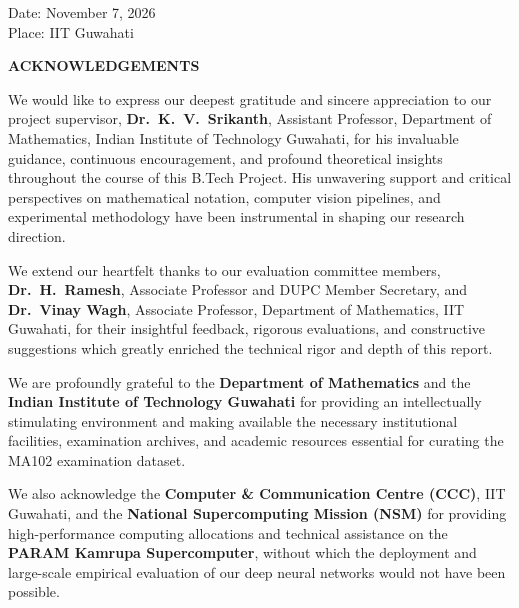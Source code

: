 \documentclass[12pt,a4paper]{report}
\theoremstyle{plain}
\theoremstyle{definition}
\theoremstyle{remark}
\begin{document}
\vspace{1.2cm}
\noindent Date: November 7, 2026 \\
\noindent Place: IIT Guwahati

\clearpage

\begin{center}
{\Large{\bf{ACKNOWLEDGEMENTS}}}
\end{center}
\vspace{0.5cm}

\noindent
We would like to express our deepest gratitude and sincere appreciation to our project supervisor, \textbf{Dr.~K.~V.~Srikanth}, Assistant Professor, Department of Mathematics, Indian Institute of Technology Guwahati, for his invaluable guidance, continuous encouragement, and profound theoretical insights throughout the course of this B.Tech Project. His unwavering support and critical perspectives on mathematical notation, computer vision pipelines, and experimental methodology have been instrumental in shaping our research direction.

\vspace{0.4cm}
\noindent
We extend our heartfelt thanks to our evaluation committee members, \textbf{Dr.~H.~Ramesh}, Associate Professor and DUPC Member Secretary, and \textbf{Dr.~Vinay Wagh}, Associate Professor, Department of Mathematics, IIT Guwahati, for their insightful feedback, rigorous evaluations, and constructive suggestions which greatly enriched the technical rigor and depth of this report.

\vspace{0.4cm}
\noindent
We are profoundly grateful to the \textbf{Department of Mathematics} and the \textbf{Indian Institute of Technology Guwahati} for providing an intellectually stimulating environment and making available the necessary institutional facilities, examination archives, and academic resources essential for curating the MA102 examination dataset.

\vspace{0.4cm}
\noindent
We also acknowledge the \textbf{Computer \& Communication Centre (CCC)}, IIT Guwahati, and the \textbf{National Supercomputing Mission (NSM)} for providing high-performance computing allocations and technical assistance on the \textbf{PARAM Kamrupa Supercomputer}, without which the deployment and large-scale empirical evaluation of our deep neural networks would not have been possible.
\end{document}
